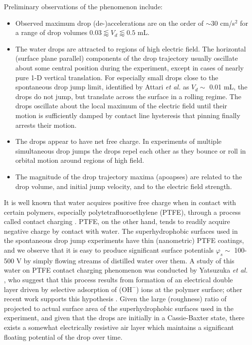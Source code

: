 \documentclass[aip,reprint, floatfix]{revtex4-1}
\begin{document}
Preliminary observations of the phenomenon include:
\begin{itemize}
\item Observed maximum drop (de-)accelerations are on the order of $\sim$30 cm/s$^2$ for a range of drop volumes $0.03 \lessapprox V_d \lessapprox 0.5$ mL.
\item The water drops are attracted to regions of high electric field. The horizontal (surface plane parallel) components of the drop trajectory usually oscillate about some central position during the experiment, except in cases of nearly pure 1-D vertical translation. For especially small drops close to the spontaneous drop jump limit, identified by Attari \emph{et al.} \citep{attari_puddle_2016} as $V_d \sim$ 0.01 mL, the drops do not jump, but translate across the surface in a rolling regime. The drops oscillate about the local maximum of the electric field until their motion is sufficiently damped by contact line hysteresis that pinning finally arrests their motion.
\item The drops appear to have net free charge. In experiments of multiple simultaneous drop jumps the drops repel each other as they bounce or roll in orbital motion around regions of high field.
\item The magnitude of the drop trajectory maxima (apoapses) are related to the drop volume, and initial jump velocity, and to the electric field strength.
\end{itemize}

It is well known that water acquires positive free charge when in contact with certain polymers, especially polytetrafluoroethylene (PTFE), through a process called contact charging \cite{langmuir_surface_1938}. PTFE, on the other hand, tends to readily acquire negative charge by contact with water. The superhydrophobic surfaces used in the spontaneous drop jump experiments have thin (nanometric) PTFE coatings, and we observe that it is easy to produce significant surface potentials $\varphi_s \sim$ 100-500 V by simply flowing streams of distilled water over them. A study of this water on PTFE contact charging phenomenon was conducted by Yatsuzuka \emph{et al.} \cite{yatsuzuka_electrification_1994}, who suggest that this process results from formation of an electrical double layer driven by selective adsorption of ($\mbox{OH}^-$) ions at the polymer surface; other recent work supports this hypothesis \cite{beattie_intrinsic_2006, strazdaite_water_2015}. Given the large (roughness) ratio of projected to actual surface area of the superhydrophobic surfaces used in the experiment, and given that the drops are initially in a Cassie-Baxter state, there exists a somewhat electrically resistive air layer which maintains a significant floating potential of the drop over time.
\end{document}
